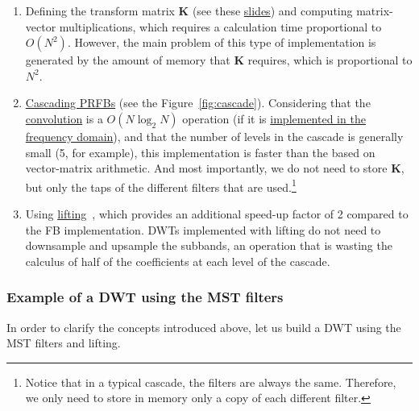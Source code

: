\begin{enumerate}

\item Defining the transform matrix ${\mathbf K}$ (see these
  \href{https://cseweb.ucsd.edu/classes/fa17/cse166-a/lec13.pdf}{slides})
  and computing matrix-vector multiplications, which requires a
  calculation time proportional to $O(N^2)$. However, the main problem
  of this type of implementation is generated by the amount of memory
  that ${\mathbf K}$ requires, which is proportional to $N^2$.

\item
  \href{https://en.wikipedia.org/wiki/Discrete_wavelet_transform#Cascading_and_filter_banks}{Cascading
    PRFBs} (see the Figure~\ref{fig:cascade}). Considering that the
  \href{https://en.wikipedia.org/wiki/Convolution}{convolution} is a
  $O(N\log_2N)$ operation (if it is
  \href{https://en.wikipedia.org/wiki/Convolution_theorem}{implemented
    in the frequency domain}), and that the number of levels in the
  cascade is generally small (5, for example), this implementation is
  faster than the based on vector-matrix arithmetic. And most
  importantly, we do not need to store ${\mathbf K}$, but only the taps
  of the different filters that are used.\footnote{Notice that in a
    typical cascade, the filters are always the same. Therefore, we
    only need to store in memory only a copy of each different filter.}

\item Using
  \href{https://en.wikipedia.org/wiki/Lifting_scheme}{lifting}~\cite{sweldens1997building},
  which provides an additional speed-up factor of 2 compared to the FB
  implementation. DWTs implemented with lifting do not need to
  downsample and upsample the subbands, an operation that is wasting
  the calculus of half of the coefficients at each level of the
  cascade.

\end{enumerate}


\subsubsection{Example of a DWT using the MST filters}

In order to clarify the concepts introduced above, let us build a
DWT using the MST filters and lifting.

